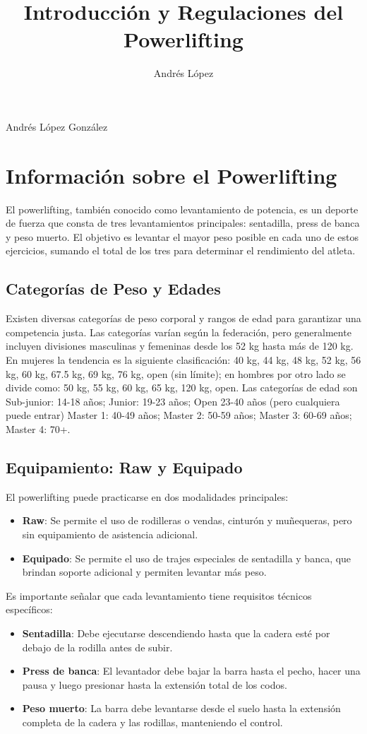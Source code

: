 \documentclass{article}
\title{Introducción y Regulaciones del Powerlifting}
\author{Andrés López}
\begin{document}
Andrés López González

\section{Información sobre el Powerlifting}

El powerlifting, también conocido como levantamiento de potencia, es un deporte de fuerza que consta de tres levantamientos principales: sentadilla, press de banca y peso muerto. El objetivo es levantar el mayor peso posible en cada uno de estos ejercicios, sumando el total de los tres para determinar el rendimiento del atleta.

\subsection{Categorías de Peso y Edades}
Existen diversas categorías de peso corporal y rangos de edad para garantizar una competencia justa. Las categorías varían según la federación, pero generalmente incluyen divisiones masculinas y femeninas desde los 52 kg hasta más de 120 kg. En mujeres la tendencia es la siguiente clasificación: 40 kg, 44 kg, 48 kg, 52 kg, 56 kg, 60 kg, 67.5 kg, 69 kg, 76 kg, open (sin límite); en hombres por otro lado se divide como: 50 kg, 55 kg, 60 kg, 65 kg, 120 kg, open. Las categorías de edad son Sub-junior: 14-18 años;
Junior: 19-23 años; Open 23-40 años (pero cualquiera puede entrar)
Master 1: 40-49 años;
Master 2: 50-59 años;
Master 3: 60-69 años;
Master 4: 70+.

\subsection{Equipamiento: Raw y Equipado}
El powerlifting puede practicarse en dos modalidades principales:
\begin{itemize}
    \item \textbf{Raw}: Se permite el uso de rodilleras o vendas, cinturón y muñequeras, pero sin equipamiento de asistencia adicional.
    \item \textbf{Equipado}: Se permite el uso de trajes especiales de sentadilla y banca, que brindan soporte adicional y permiten levantar más peso.
\end{itemize}

Es importante señalar que cada levantamiento tiene requisitos técnicos específicos:
\begin{itemize}
    \item \textbf{Sentadilla}: Debe ejecutarse descendiendo hasta que la cadera esté por debajo de la rodilla antes de subir.
    \item \textbf{Press de banca}: El levantador debe bajar la barra hasta el pecho, hacer una pausa y luego presionar hasta la extensión total de los codos.
    \item \textbf{Peso muerto}: La barra debe levantarse desde el suelo hasta la extensión completa de la cadera y las rodillas, manteniendo el control.
\end{itemize}
\end{document}
